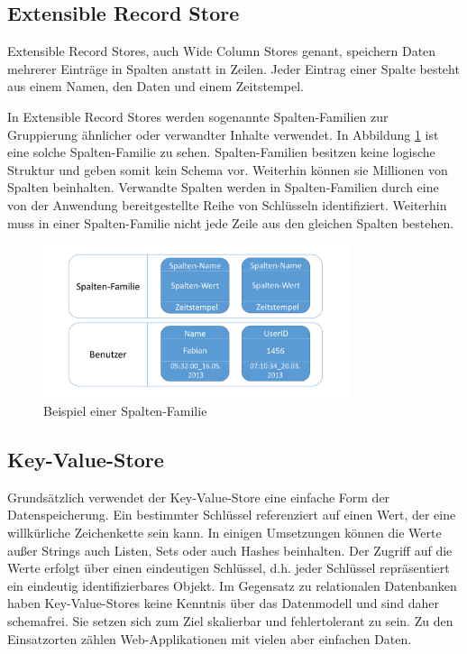 \subsection{Extensible Record Store}
\label{ch:grundlagen:sec:NoSQL:ExtensibleRecordStore}

Extensible Record Stores, auch Wide Column Stores genant, speichern Daten mehrerer Einträge in Spalten anstatt in Zeilen. Jeder Eintrag einer Spalte besteht aus einem Namen, den Daten und einem Zeitstempel.

In Extensible Record Stores werden sogenannte Spalten-Familien zur Gruppierung ähnlicher oder verwandter Inhalte verwendet. In Abbildung \ref{wide_column_store} ist eine solche Spalten-Familie zu sehen. Spalten-Familien besitzen keine logische Struktur und geben somit kein Schema vor. Weiterhin können sie Millionen von Spalten beinhalten. Verwandte Spalten werden in Spalten-Familien durch eine von der Anwendung bereitgestellte Reihe von Schlüsseln identifiziert. Weiterhin muss in einer Spalten-Familie nicht jede Zeile aus den gleichen Spalten bestehen.

\begin{figure}[htbp]
	\centering
  \includegraphics[width=0.8\textwidth, width=0.8\textwidth]{pics/wide_column_stores.pdf}
	\caption{Beispiel einer Spalten-Familie}
	\label{wide_column_store}
\end{figure}



\subsection{Key-Value-Store}
\label{ch:grundlagen:sec:NoSQL:KeyValueStore}

Grundsätzlich verwendet der Key-Value-Store eine einfache Form der Datenspeicherung. Ein bestimmter Schlüssel referenziert auf einen Wert, der eine willkürliche Zeichenkette sein kann. In einigen Umsetzungen können die Werte außer Strings auch Listen, Sets oder auch Hashes beinhalten. Der Zugriff auf die Werte erfolgt über einen eindeutigen Schlüssel, d.h. jeder Schlüssel repräsentiert ein eindeutig identifizierbares Objekt. Im Gegensatz zu relationalen Datenbanken haben Key-Value-Stores keine Kenntnis über das Datenmodell und sind daher schemafrei. Sie setzen sich zum Ziel skalierbar und fehlertolerant zu sein. Zu den Einsatzorten zählen Web-Applikationen mit vielen aber einfachen Daten.

